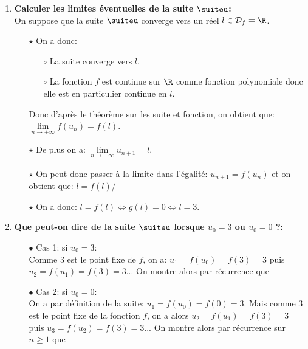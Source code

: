 \begin{correction}
\begin{enumerate}
\item \textbf{Calculer les limites \'eventuelles de la suite $\suiteu$:}\\
\noindent On suppose que la suite $\suiteu$ converge vers un r\'eel $l\in\mathcal{D}_f=\R$.
\begin{itemize}
\item[$\star$] On a donc:
\begin{itemize}
\item[$\circ$] La suite converge vers $l$.
\item[$\circ$] La fonction $f$ est continue sur $\R$ comme fonction polynomiale donc elle est en particulier continue en $l$.
\end{itemize}
Donc d'apr\`{e}s le th\'eor\`{e}me sur les suite et fonction, on obtient que: $\lim\limits_{n\to +\infty} f(u_n)=f(l)$.
\item[$\star$] De plus on a: $\lim\limits_{n\to +\infty} u_{n+1}=l$.
\item[$\star$] On peut donc passer \`{a} la limite dans l'\'egalit\'e: $u_{n+1}=f(u_n)$ et on obtient que: $l=f(l)$/
\item[$\star$] On a donc: $l=f(l)\Leftrightarrow g(l)=0\Leftrightarrow l=3$. \\
\noindent {}
\end{itemize}
\item \textbf{Que peut-on dire de la suite $\suiteu$ lorsque $u_0=3$ ou $u_0=0$ ?:}
\begin{itemize}
\item[$\bullet$] Cas 1: si $u_0=3$:\\
\noindent Comme 3 est le point fixe de $f$, on a: $u_1=f(u_0)=f(3)=3$ puis $u_2=f(u_1)=f(3)=3$... On montre alors par r\'ecurrence que

\item[$\bullet$] Cas 2: si $u_0=0$:\\
\noindent On a par d\'efinition de la suite: $u_1=f(u_0)=f(0)=3$. Mais comme 3 est le point fixe de la fonction $f$, on a alors $u_2=f(u_1)=f(3)=3$ puis $u_3=f(u_2)=f(3)=3$... On montre alors par r\'ecurrence sur $n\geq 1$ que 


\end{itemize}
\end{enumerate}
\end{correction}
